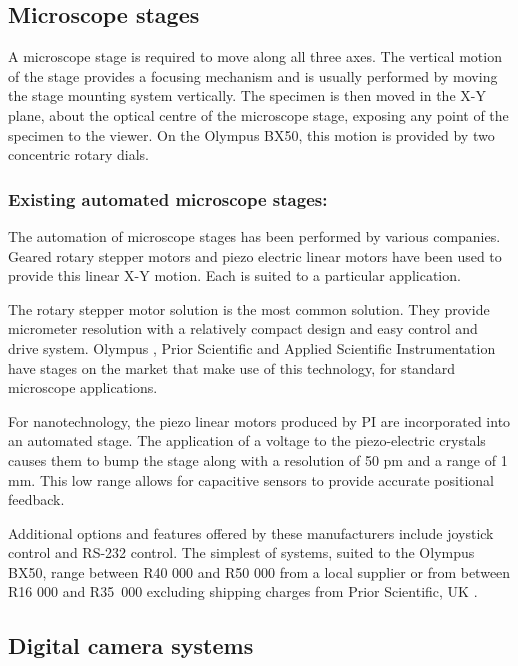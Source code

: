 \documentclass[10pt,twocolumn]{witseiepaper}
\begin{document}
\subsection{Microscope stages}

A microscope stage is required to move along all three axes.  The vertical
motion of the stage provides a focusing mechanism and is usually performed by
moving the stage mounting system vertically.  The specimen is then moved in
the X-Y plane, about the optical centre of the microscope stage, exposing any
point of the specimen to the viewer.  On the Olympus BX50, this motion is
provided by two concentric rotary dials.

\subsubsection*{Existing automated microscope stages:}

The automation of microscope stages has been performed by various companies.
Geared rotary stepper motors and piezo electric linear motors have been used
to provide this linear X-Y motion.  Each is suited to a particular
application.

The rotary stepper motor solution is the most common solution.  They provide
micrometer resolution with a relatively compact design and easy control and
drive system.  Olympus \cite{Olympus}, Prior Scientific \cite{Prior} and Applied
Scientific Instrumentation \cite{Ms4} have stages on the market that make use
of this technology, for standard microscope applications.

For nanotechnology, the piezo linear motors produced by PI \cite{PI} are
incorporated into an automated stage.  The application of a voltage to the
piezo-electric crystals causes them to bump the stage along with a resolution
of 50 pm and a range of 1 mm.  This low range allows for capacitive sensors to
provide accurate positional feedback.

Additional options and features offered by these manufacturers include
joystick control and RS-232 control.  The simplest of systems, suited to the
Olympus BX50, range between R40 000 and R50 000 from a local
supplier \cite{Elmulab} or from between R16 000 and \mbox{R35 000} excluding
shipping charges from Prior Scientific, UK \cite{Prior}. 

\subsection{Digital camera systems}
\end{document}
